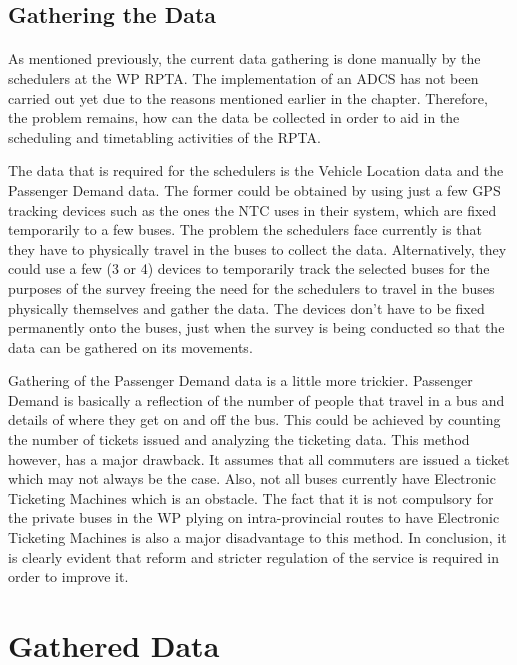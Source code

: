 \documentclass[12pt, oneside]{report}
\begin{document}
\subsection{Gathering the Data} 

\paragraph{ } As mentioned previously, the current data gathering is done manually by the schedulers at the WP RPTA. The implementation of an ADCS has not been carried out yet due to the reasons mentioned earlier in the chapter. Therefore, the problem remains, how can the data be collected in order to aid in the scheduling and timetabling activities of the RPTA.

The data that is required for the schedulers is the Vehicle Location data and the Passenger Demand data. The former could be obtained by using just a few GPS tracking devices such as the ones the NTC uses in their system, which are fixed temporarily to a few buses. The problem the schedulers face currently is that they have to physically travel in the buses to collect the data. Alternatively, they could use a few (3 or 4) devices to temporarily track the selected buses for the purposes of the survey freeing the need for the schedulers to travel in the buses physically themselves and gather the data. The devices don't have to be fixed permanently onto the buses, just when the survey is being conducted so that the data can be gathered on its movements.

Gathering of the Passenger Demand data is a little more trickier. Passenger Demand is basically a reflection of the number of people that travel in a bus and details of where they get on and off the bus. This could be achieved by counting the number of tickets issued and analyzing the ticketing data. This method however, has a major drawback. It assumes that all commuters are issued a ticket which may not always be the case. Also, not all buses currently have Electronic Ticketing Machines which is an obstacle. The fact that it is not compulsory for the private buses in the WP plying on intra-provincial routes to have Electronic Ticketing Machines is also a major disadvantage to this method. In conclusion, it is clearly evident that reform and stricter regulation of the service is required in order to improve it.

\newpage

\section{Gathered Data}
\end{document}
